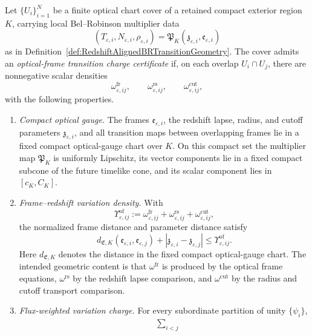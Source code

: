 \begin{definition}\label{def:OpticalFrameTransitionChargeCertificate}
Let $\{U_i\}_{i=1}^N$ be a finite optical chart cover of a retained compact exterior region $K$, carrying local Bel--Robinson multiplier data
\[
    (T_{\varepsilon,i},N_{\varepsilon,i},\rho_{\varepsilon,i})
    =
    \mathfrak P_K(\mathfrak z_{\varepsilon,i},\mathfrak e_{\varepsilon,i})
\]
as in Definition~\ref{def:RedshiftAlignedBRTransitionGeometry}.  The cover admits an \emph{optical-frame transition charge certificate} if, on each overlap $U_i\cap U_j$, there are nonnegative scalar densities
\[
    \omega^{\mathrm{fr}}_{\varepsilon,ij},
    \qquad
    \omega^{\mathrm{rs}}_{\varepsilon,ij},
    \qquad
    \omega^{\mathrm{cut}}_{\varepsilon,ij},
\]
with the following properties.
\begin{enumerate}
    \item \emph{Compact optical gauge.} The frames $\mathfrak e_{\varepsilon,i}$, the redshift lapse, radius, and cutoff parameters $\mathfrak z_{\varepsilon,i}$, and all transition maps between overlapping frames lie in a fixed compact optical-gauge chart over $K$.  On this compact set the multiplier map $\mathfrak P_K$ is uniformly Lipschitz, its vector components lie in a fixed compact subcone of the future timelike cone, and its scalar component lies in $[c_K,C_K]$.
    \item \emph{Frame--redshift variation density.}  With
    \[
        \Upsilon^{\mathrm{of}}_{\varepsilon,ij}
        :=
        \omega^{\mathrm{fr}}_{\varepsilon,ij}
        +
        \omega^{\mathrm{rs}}_{\varepsilon,ij}
        +
        \omega^{\mathrm{cut}}_{\varepsilon,ij},
    \]
    the normalized frame distance and parameter distance satisfy
    \[
        d_{\mathfrak E,K}(\mathfrak e_{\varepsilon,i},\mathfrak e_{\varepsilon,j})
        +
        |\mathfrak z_{\varepsilon,i}-\mathfrak z_{\varepsilon,j}|
        \le
        \Upsilon^{\mathrm{of}}_{\varepsilon,ij}.
    \]
    Here $d_{\mathfrak E,K}$ denotes the distance in the fixed compact optical-gauge chart.  The intended geometric content is that $\omega^{\mathrm{fr}}$ is produced by the optical frame equations, $\omega^{\mathrm{rs}}$ by the redshift lapse comparison, and $\omega^{\mathrm{cut}}$ by the radius and cutoff transport comparison.
    \item \emph{Flux-weighted variation charge.}  For every subordinate partition of unity $\{\psi_i\}$,
    \[
    \begin{split}
        &\sum_{i<j}

\end{split}\]
\end{enumerate}
\end{definition}

